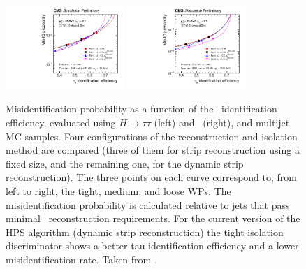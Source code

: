 \begin{figure}[ht]
  \begin{center}
    \includegraphics[width=0.4\textwidth]{figuras/Chapter3/IsoPerformanceHiggs}
    \includegraphics[width=0.4\textwidth]{figuras/Chapter3/IsoPerformanceZprime}
    \caption{Misidentification probability as a function of the \tauh~identification 
    efficiency, evaluated using $H \rightarrow \tau\tau$ (left) and \Zprimetotautau~(right), 
    and multijet MC samples. Four configurations of the reconstruction and 
    isolation method are compared (three of them for strip reconstruction using a 
    fixed  size, and the remaining one, for the dynamic strip reconstruction). The three points 
    on each curve correspond to, from left to right, the tight, medium, and loose WPs. The
    misidentification probability is calculated relative to jets that pass minimal \tauh~reconstruction
    requirements. For the current version of the HPS algorithm (dynamic strip reconstruction) the 
    tight isolation discriminator shows a better tau identification efficiency and a 
    lower misidentification rate. Taken from \cite{CMS-PAS-TAU-16-002}.
    }
    \label{fig:IsoPerformance}
  \end{center}
\end{figure} 

